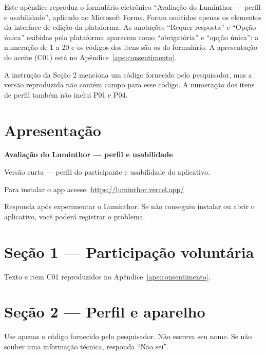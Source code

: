 
Este apêndice reproduz o formulário eletrônico ``Avaliação do Luminthor ---
perfil e usabilidade'', aplicado no Microsoft Forms. Foram omitidos apenas os elementos da interface de edição da
plataforma. As anotações ``Requer resposta'' e ``Opção única'' exibidas pela
plataforma aparecem como ``obrigatória'' e ``opção única''; a numeração de 1 a 20
e os códigos dos itens são os do formulário. A apresentação do aceite (C01) está no
Apêndice~\ref{ape:consentimento}.

A instrução da Seção 2 menciona um código fornecido pelo pesquisador, mas a versão
reproduzida não contém campo para esse código. A numeração dos itens de perfil
também não inclui P01 e P04.

\section*{Apresentação}

\textbf{Avaliação do Luminthor --- perfil e usabilidade}

Versão curta --- perfil do participante e usabilidade do aplicativo.

Para instalar o app acesse: \url{https://luminthor.vercel.app/}

Responda após experimentar o Luminthor. Se não conseguiu instalar ou abrir o
aplicativo, você poderá registrar o problema.

\section*{Seção 1 --- Participação voluntária}

Texto e item C01 reproduzidos no Apêndice~\ref{ape:consentimento}.

\section*{Seção 2 --- Perfil e aparelho}

Use apenas o código fornecido pelo pesquisador. Não escreva seu nome. Se não souber
uma informação técnica, responda ``Não sei''.

